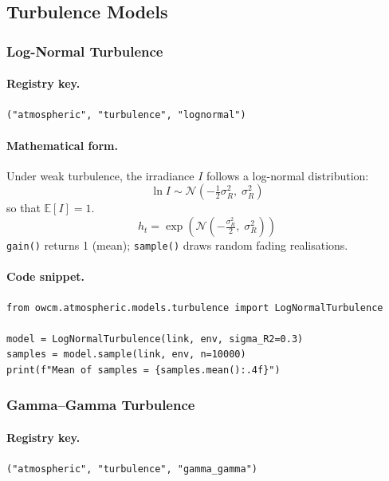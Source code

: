 \documentclass[11pt,a4paper]{article}
\begin{document}
\subsection{Turbulence Models}

\subsubsection{Log-Normal Turbulence}
\label{sec:lognormal}

\paragraph{Registry key.} \texttt{("atmospheric", "turbulence", "lognormal")}

\paragraph{Mathematical form.}
Under weak turbulence, the irradiance $I$ follows a log-normal distribution:
\begin{equation}
\ln I \sim \mathcal{N}\!\left(-\tfrac{1}{2}\sigma_R^2,\;\sigma_R^2\right)
\end{equation}
so that $\mathbb{E}[I]=1$.
\begin{equation}
\boxed{h_t = \exp\!\left(\mathcal{N}\!\left(-\tfrac{\sigma_R^2}{2},\;\sigma_R^2\right)\right)}
\end{equation}
\texttt{gain()} returns 1 (mean); \texttt{sample()} draws random fading
realisations.

\paragraph{Code snippet.}
\begin{lstlisting}
from owcm.atmospheric.models.turbulence import LogNormalTurbulence

model = LogNormalTurbulence(link, env, sigma_R2=0.3)
samples = model.sample(link, env, n=10000)
print(f"Mean of samples = {samples.mean():.4f}")
\end{lstlisting}

\subsubsection{Gamma--Gamma Turbulence}
\label{sec:gamma_gamma}

\paragraph{Registry key.} \texttt{("atmospheric", "turbulence", "gamma\_gamma")}
\end{document}

